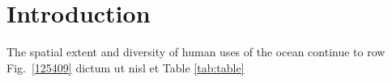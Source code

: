 \section{Introduction}
\label{introduction}

The spatial extent and diversity of human uses of the ocean continue to row  Fig.~\ref{125409} dictum ut nisl et Table \ref{tab:table}
